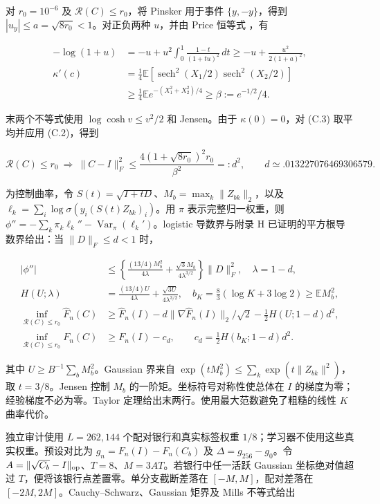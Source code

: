 \documentclass[11pt,a4paper]{article}
\begin{document}
对 \(r_0=10^{-6}\) 及 \(\mathcal R(C)\le r_0\)，将 Pinsker 用于事件
\(\{y,-y\}\)，得到 \(|u_y|\le a=\sqrt{8r_0}<1\)。对正负两种 \(u\)，并由
Price 恒等式 \citep{price1958}，有

\[
\begin{aligned}
-\log(1+u)&=-u+u^2\int_0^1\frac{1-t}{(1+tu)^2}\,dt
\ge-u+\frac{u^2}{2(1+a)^2},\\
\kappa'(c)&=\tfrac14\mathbb E[\operatorname{sech}^2(X_1/2)\operatorname{sech}^2(X_2/2)]\\
&\ge\tfrac14\mathbb E e^{-(X_1^2+X_2^2)/4}\ge\beta:=e^{-1/2}/4.
\end{aligned}
\tag{C.3}
\]

末两个不等式使用 \(\log\cosh v\le v^2/2\) 和 Jensen。由于
\(\kappa(0)=0\)，对 (C.3) 取平均并应用 (C.2)，得到

\[
\mathcal R(C)\le r_0\ \Longrightarrow\
\|C-I\|_F^2\le\frac{4(1+\sqrt{8r_0})^2r_0}{\beta^2}=:d^2,
\qquad d\simeq.013227076469306579.
\tag{C.4}
\]

为控制曲率，令 \(S(t)=\sqrt{I+tD}\)、\(M_b=\max_k\|Z_{bk}\|_2\)，以及
\(\ell_k=\sum_i\log\sigma(y_i(S(t)Z_{bk})_i)\)。用 \(\pi\)
表示完整归一权重，则
\(\phi''=-\sum_k\pi_k\ell_k''-\operatorname{Var}_{\pi}(\ell_k')\)。logistic
导数界与附录 H 已证明的平方根导数界给出：当 \(\|D\|_F\le d<1\) 时，

\[
\begin{aligned}
|\phi''|&\le\left\{\frac{(13/4)M_b^2}{4\lambda}+\frac{\sqrt3M_b}{4\lambda^{3/2}}\right\}\|D\|_F^2,\quad\lambda=1-d,\\
H(U;\lambda)&=\frac{(13/4)U}{4\lambda}+\frac{\sqrt{3U}}{4\lambda^{3/2}},\quad
b_K=\tfrac83(\log K+3\log2)\ge\mathbb E M_b^2,\\
\inf_{\mathcal R(C)\le r_0}\widehat F_n(C)&\ge\widehat F_n(I)-d\|\nabla\widehat F_n(I)\|_2/\sqrt2-\tfrac12H(U;1-d)d^2,\\
\inf_{\mathcal R(C)\le r_0}F_n(C)&\ge F_n(I)-c_d,\qquad c_d=\tfrac12H(b_K;1-d)d^2.
\end{aligned}
\tag{C.5}
\]

其中 \(U\ge B^{-1}\sum_bM_b^2\)。Gaussian 界来自
\(\exp(tM_b^2)\le\sum_k\exp(t\|Z_{bk}\|^2)\)，取 \(t=3/8\)。Jensen 控制
\(M_b\) 的一阶矩。坐标符号对称性使总体在 \(I\)
的梯度为零；经验梯度不必为零。Taylor
定理给出末两行。使用最大范数避免了粗糙的线性 \(K\) 曲率代价。

独立审计使用 \(L=262,144\) 个配对银行和真实标签权重
\(1/8\)；学习器不使用这些真实权重。预设对比为 \(g_n=F_n(I)-F_n(C_b)\) 及
\(\Delta=g_{256}-g_0\)。令
\(A=\|\sqrt{C_b}-I\|_{\rm op}\)、\(T=8\)、\(M=3AT\)。若银行中任一活跃
Gaussian 坐标绝对值超过 \(T\)，便将该银行点差置零。单分支截断差落在
\([-M,M]\)，配对差落在 \([-2M,2M]\)。Cauchy--Schwarz、Gaussian 矩界及
Mills 不等式给出
\end{document}
